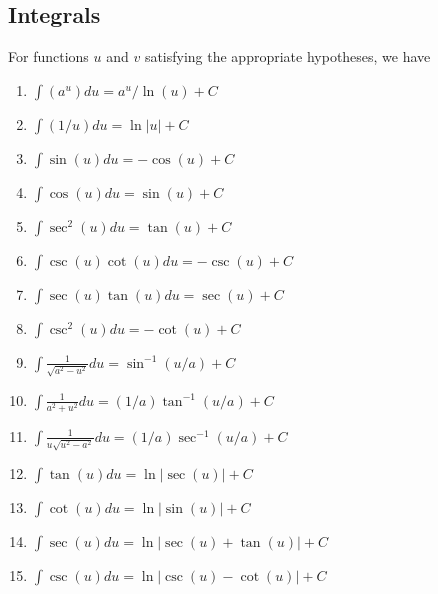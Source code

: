 \documentclass{article}[11pt]
\theoremstyle{definition}
\numberwithin{equation}{section}
\begin{document}
\subsection{Integrals}
For functions \(u\) and \(v\) satisfying the appropriate hypotheses, we have
\begin{multicols}{2}
	\begin{enumerate}[1.]
		\item \( \displaystyle \int (a^u) du = a^u/\ln(u) + C \)
		\item \( \displaystyle \int (1/u) du = \ln|u| + C \)
		\item \( \displaystyle \int \sin(u) du = -\cos(u) + C \)
		\item \( \displaystyle \int \cos(u) du = \sin(u) + C \)
		\item \( \displaystyle \int \sec^2(u) du = \tan(u) + C \)
		\item \( \displaystyle \int \csc(u)\cot(u) du = -\csc(u) + C \)
		\item \( \displaystyle \int \sec(u)\tan(u) du = \sec(u) + C \)
		\item \( \displaystyle \int \csc^2(u) du = -\cot(u) + C \)
		\item \( \displaystyle \int \frac{1}{\sqrt{a^2-u^2}} du = \sin^{-1}(u/a) + C \)
		\item \( \displaystyle \int \frac{1}{a^2+u^2}  du = (1/a)\tan^{-1}(u/a) + C \)
		\item \( \displaystyle \int \frac{1}{u\sqrt{u^2-a^2}}  du = (1/a)\sec^{-1}(u/a) + C \)
		\item \( \displaystyle \int \tan(u) 	du = \ln|\sec(u)| + C \)
		\item \( \displaystyle \int \cot(u)  du = \ln|\sin(u)| + C \)
		\item \( \displaystyle \int \sec(u)  du = \ln|\sec(u) + \tan(u)| + C \)
		\item \( \displaystyle \int \csc(u)  du = \ln|\csc(u) - \cot(u)| + C \)
	\end{enumerate}
\end{multicols}
\end{document}
